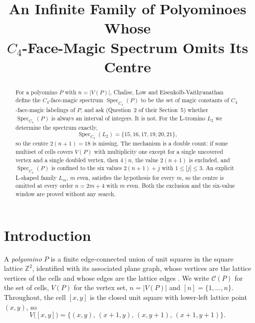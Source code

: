 \documentclass[11pt]{amsart}
\title[A non-interval $C_4$-face-magic spectrum]
{An Infinite Family of Polyominoes Whose\\ $C_4$-Face-Magic Spectrum Omits Its Centre}
\date{}
\DeclareMathOperator{\Spec}{Spec}
\newcommand{\cells}{\mathcal C}
\begin{document}
\begin{abstract}
For a polyomino $P$ with $n=|V(P)|$, Chalise, Low and
Eisenkolb-Vaithyanathan define the $C_4$-face-magic spectrum
$\Spec_{C_4}(P)$ to be the set of magic constants of $C_4$-face-magic
labelings of $P$, and ask (Question~2 of their Section~5) whether
$\Spec_{C_4}(P)$ is always an interval of integers. It is not. For the
L-tromino $L_2$ we determine the spectrum exactly,
\[
  \Spec_{C_4}(L_2)=\{15,16,17,19,20,21\},
\]
so the centre $2(n+1)=18$ is missing. The mechanism is a double count: if
some multiset of cells covers $V(P)$ with multiplicity one except for a
single uncovered vertex and a single doubled vertex, then $4\mid n$, the
value $2(n+1)$ is excluded, and $\Spec_{C_4}(P)$ is confined to the six
values $2(n+1)+j$ with $1\le|j|\le3$. An explicit L-shaped family $L_m$,
$m$ even, satisfies the hypothesis for every $m$, so the centre is omitted
at every order $n=2m+4$ with $m$ even. Both the exclusion and the six-value
window are proved without any search.
\end{abstract}

\maketitle

\section{Introduction}

A \emph{polyomino} $P$ is a finite edge-connected union of unit squares in the
square lattice $\mathbb Z^2$, identified with its associated plane graph, whose
vertices are the lattice vertices of the cells and whose edges are the lattice
edges \cite[Section~1]{CLE}. We write $\cells(P)$ for the set of cells,
$V(P)$ for the vertex set, $n=|V(P)|$ and $[n]=\{1,\ldots,n\}$. Throughout,
the cell $[x,y]$ is the closed unit square with lower-left lattice point
$(x,y)$, so
\[
  V\bigl([x,y]\bigr)=\bigl\{(x,y),\,(x+1,y),\,(x,y+1),\,(x+1,y+1)\bigr\}.
\]
\end{document}
